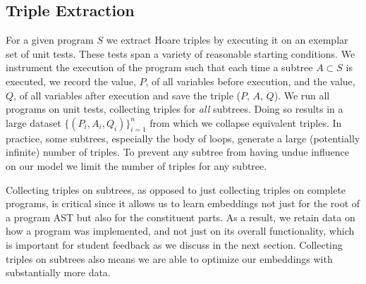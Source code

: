 





\subsection{Triple Extraction}\label{sec:triplets}
For a given program $S$ we extract Hoare triples by executing it on an exemplar set of unit tests. These tests span a variety of reasonable starting conditions. We instrument the execution of the program such that each time a subtree $A \subset S$ is executed, we record the value, $P$, of all variables before execution, and the value, $Q$, of all variables after execution and save the triple ($P$, $A$, $Q$). We run all programs on unit tests, collecting triples for \emph{all} subtrees. Doing so results in a large dataset $\{(P_i, A_i, Q_i)\}_{i=1}^n$ from which we collapse equivalent
triples.
In practice, some subtrees, especially the body of loops, generate a large (potentially infinite) number of triples. To prevent any subtree from having undue influence on our model we limit the number of triples for any subtree. 

Collecting triples on subtrees, as opposed to just collecting triples on complete programs, is critical since it allows us to learn embeddings not just for the root of a program AST but also for the constituent parts. As a result, we retain data on how a program was implemented, and not just on its overall functionality, which is important for student feedback as we discuss in the next section.
Collecting triples on subtrees also means we are able to optimize our embeddings with substantially more data.


